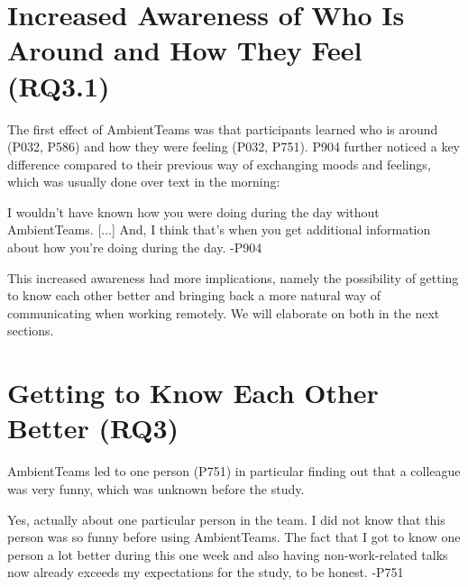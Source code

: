 

\section{Increased Awareness of Who Is Around and How They Feel (RQ3.1)}
The first effect of AmbientTeams was that participants learned who is around (P032, P586) and how they were feeling (P032, P751). P904 further noticed a key difference compared to their previous way of exchanging moods and feelings, which was usually done over text in the morning:


\begin{displayquote}[][]
    [...] I wouldn't have known how you were doing during the day without AmbientTeams. [...] And, I think that's when you get additional information about how you're doing during the day. -P904
\end{displayquote}

This increased awareness had more implications, namely the possibility of getting to know each other better and bringing back a more natural way of communicating when working remotely. We will elaborate on both in the next sections.

\section{Getting to Know Each Other Better (RQ3)}
AmbientTeams led to one person (P751) in particular finding out that a colleague was very funny, which was unknown before the study.

\begin{displayquote}
    Yes, actually about one particular person in the team. I did not know that this person was so funny before using AmbientTeams. The fact that I got to know one person a lot better during this one week and also having non-work-related talks now already exceeds my expectations for the study, to be honest. -P751
\end{displayquote}

